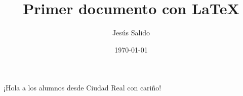\documentclass{article}
\title{Primer documento con \LaTeX}
\author{Jesús Salido}
\date{\today}
\begin{document}
\maketitle

¡Hola a los alumnos desde Ciudad Real con cariño! 
\end{document}
